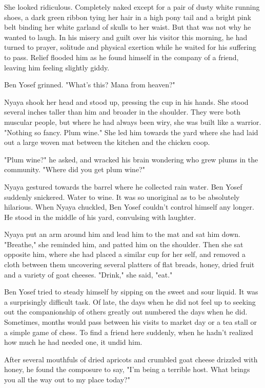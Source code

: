\documentclass{amsart}
\begin{document}
She looked ridiculous. Completely naked except for a pair of dusty white running shoes, a dark green ribbon tying her hair in a high pony tail and a bright pink belt binding her white garland of skulls to her waist. But that was not why he wanted to laugh. In his misery and guilt over his visitor this morning, he had turned to prayer, solitude and physical exertion while he waited for his suffering to pass. Relief flooded him as he found himself in the company of a friend, leaving him feeling slightly giddy. 

Ben Yosef grinned. "What's this? Mana from heaven?"

Nyaya shook her head and stood up, pressing the cup in his hands. She stood several inches taller than him and broader in the shoulder. They were both muscular people, but where he had always been wiry, she was built like a warrior. "Nothing so fancy. Plum wine." She led him towards the yard where she had laid out a large woven mat between the kitchen and the chicken coop. 

"Plum wine?" he asked, and wracked his brain wondering who grew plums in the community. "Where did you get plum wine?"

Nyaya gestured towards the barrel where he collected rain water. Ben Yosef suddenly snickered. Water to wine. It was so unoriginal as to be absolutely hilarious. When Nyaya chuckled, Ben Yosef couldn't control himself any longer. He stood in the middle of his yard, convulsing with laughter. 

Nyaya put an arm around him and lead him to the mat and sat him down. "Breathe," she reminded him, and patted him on the shoulder. Then she sat opposite him, where she had placed a similar cup for her self, and removed a cloth between them uncovering several platters of flat breads, honey, dried fruit and a variety of goat cheeses. "Drink," she said, "eat."

Ben Yosef tried to steady himself by sipping on the sweet and sour liquid. It was
a surprisingly difficult task. Of late, the days when he did not feel up to seeking out the companionship of others greatly out numbered the days when he did. Sometimes, months would pass between his visits to market day or a tea stall or a simple game of chess. To find a friend here suddenly, when he hadn't realized how much he had needed one, it undid him.

After several mouthfuls of dried apricots and crumbled goat cheese drizzled with honey, he found the composure to say, "I'm being a terrible host. What brings you all the way out to my place today?"
\end{document}
